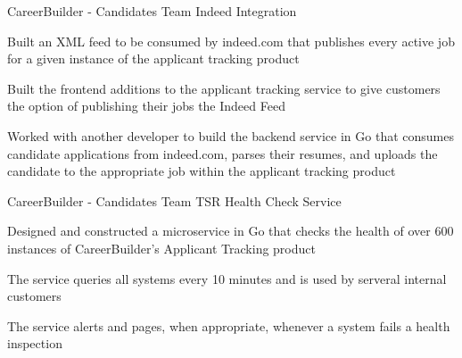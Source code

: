 
\begin{cventries}

\cventry
{CareerBuilder - Candidates Team} %
{Indeed Integration} %
{} %
{} %
{
	\begin{cvitems} %
		\item {Built an XML feed to be consumed by indeed.com that publishes every active job for a given instance of the applicant tracking product}  
		\item {Built the frontend additions to the applicant tracking service to give customers the option of publishing their jobs the Indeed Feed}
		\item {Worked with another developer to build the backend service in Go that consumes candidate applications from indeed.com, parses their resumes, and uploads the candidate to the appropriate job within the applicant tracking product} 
	\end{cvitems}
}

\cventry
  	{CareerBuilder - Candidates Team} %
    {TSR Health Check Service} %
    {} %
    {} %
    {
      \begin{cvitems} %
        \item {Designed and constructed a microservice in Go that checks the health of over 600 instances of CareerBuilder's Applicant Tracking product}  
        \item {The service queries all systems every 10 minutes and is used by serveral internal customers}
        \item {The service alerts and pages, when appropriate, whenever a system fails a health inspection} 
      \end{cvitems}
    }



\end{cventries}
